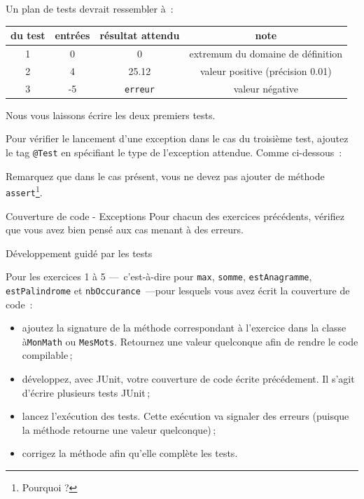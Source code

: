 \documentclass[a4paper,11pt]{style-esi/td}
\begin{document}
	Un plan de tests devrait ressembler à~:

	\begin{center}
		\begin{tabular}{|c|c|c|c|}
			\hline
			\no du test & entrées & résultat attendu & note \\
			\hline
			1 & 0 & 0 & extremum du domaine de définition \\
			\hline
			2 & 4 & 25.12 & valeur positive (précision 0.01) \\
			\hline
			3 & -5 & \texttt{erreur} & valeur négative \\
			\hline
		\end{tabular}
	\end{center}

	Nous vous laissons écrire les deux premiers tests. 
	
	Pour vérifier le lancement d'une exception dans le cas du troisième test,
	ajoutez le tag \texttt{@Test} en spécifiant le type de l'exception
	attendue. Comme ci-dessous~:
	

	Remarquez que dans le cas présent, vous ne devez pas ajouter de méthode \texttt{assert}\footnote{Pourquoi ?}.

	\begin{Exercice}{Couverture de code - Exceptions}
		Pour chacun des exercices précédents, vérifiez que vous avez bien pensé aux cas menant à des erreurs.
	\end{Exercice}

	\begin{Exercice}{Développement guidé par les tests}

		Pour les exercices 1 à 5 —~c'est-à-dire pour \texttt{max},
		\texttt{somme}, \texttt{estAnagramme}, \texttt{estPalindrome} et
		\texttt{nbOccurance}~—pour lesquels vous avez écrit la couverture de
		code~:

		\begin{itemize}
			\item ajoutez la signature de la méthode correspondant à l'exercice dans la classe à\texttt{MonMath} ou \texttt{MesMots}. Retournez une valeur quelconque afin de rendre le code compilable\,;
			\item développez, avec JUnit, votre couverture de code écrite précédement. Il s'agit d'écrire plusieurs tests JUnit\,;
			\item lancez l'exécution des tests. Cette exécution va signaler des erreurs (puisque la méthode retourne une valeur quelconque)\,;
			\item corrigez la méthode afin qu'elle complète les tests. 
		\end{itemize}

	\end{Exercice}
\end{document}

